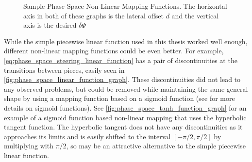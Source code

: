 \begin{figure}
\centering
{}
\hfill
{}
\caption[Sample Phase Space Non-Linear Mapping Functions]{Sample Phase Space Non-Linear Mapping Functions. The horizontal axis in both of these graphs is the lateral offset $d$ and the vertical axis is the desired $\delta\Psi$}
\label{fig:phase_space_sample_function_graphs}
\end{figure}

While the simple piecewise linear function used in this thesis worked well enough, different non-linear mapping functions could be even better. For example, \eqref{eq:phase_space_steering_linear_function} has a pair of discontinuities at the transitions between pieces, easily seen in \autoref{fig:phase_space_linear_function_graph}. These discontinuities did not lead to any observed problems, but could be removed while maintaining the same general shape by using a mapping function based on a sigmoid function (see \autocite{SigmoidFunctionWiki} for more details on sigmoid functions). See \autoref{fig:phase_space_tanh_function_graph} for an example of a sigmoid function based non-linear mapping that uses the hyperbolic tangent function. The hyperbolic tangent does not have any discontinuities as it approaches its limits and is easily shifted to the interval $\left[-\pi/2,\pi/2\right]$ by multiplying with $\pi/2$, so may be an attractive alternative to the simple piecewise linear function.

